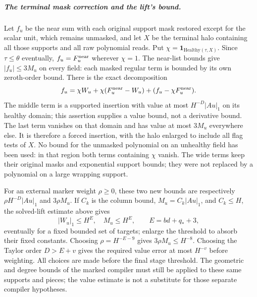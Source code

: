 \subparagraph{The terminal mask correction and the lift's bound.}
Let $f_u$ be the near sum with each original support mask restored
except for the scalar unit, which remains unmasked,
and let $X$ be the terminal halo containing all those supports and
all raw polynomial reads. Put $\chi=\mathbf1_{\mathrm{Healthy}(\tau,X)}$.
Since $\tau\le\theta$ eventually, $f_u=F_u^{\rm near}$ wherever
$\chi=1$. The near-list bounds give $|f_u|\le3M_u$ on every field:
each masked regular term is bounded by its own zeroth-order bound.
There is the exact decomposition
\begin{equation}\label{eq:rank-terminal-three-pieces}
 f_u=\chi W_u+\chi(F_u^{\rm near}-W_u)
                         +(f_u-\chi F_u^{\rm near}).
\end{equation}
The middle term is a supported insertion with value at most
$H^{-D}|Au|_1$ on its healthy domain; this assertion supplies a value bound, not a
derivative bound. The last term vanishes on
that domain and has value at most $3M_u$ everywhere else. It is
therefore a forced insertion, with the halo enlarged to include
all flag tests of $X$. No bound for the unmasked polynomial on an
unhealthy field has been used: in that region both terms containing
$\chi$ vanish. The wide terms keep their original masks and
exponential support bounds; they were not replaced by a polynomial
on a large wrapping support.

For an external marker weight $\rho\ge0$, these two new bounds
are respectively $\rho H^{-D}|Au|_1$ and $3\rho M_u$.
If $C_k$ is the column bound, $M_u=C_k|Au|_1$, and
$C_k\le H$, the solved-lift estimate above gives
\[
 |W_u|_1\le H^E,\quad M_u\le H^E,
 \qquad E=bd+q_*+3,
\]
eventually for a fixed bounded set of targets; enlarge the threshold
to absorb their fixed constants. Choosing $\rho=H^{-E-9}$ gives
$3\rho M_u\le H^{-8}$. Choosing the Taylor order $D>E+v$
gives the required value error at most $H^{-v}$ before weighting.
All choices are made before the final stage threshold. The geometric
and degree bounds of the marked compiler must still be applied to
these same supports and pieces; the value estimate is not a substitute
for those separate compiler hypotheses.

